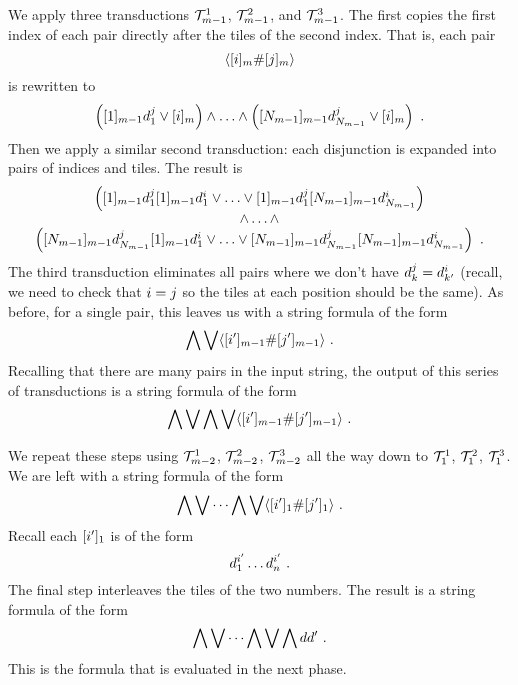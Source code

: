 We apply three transductions $\psst^1_{\expheight-1}$,
$\psst^2_{\expheight-1}$, and $\psst^3_{\expheight-1}$. The first copies
the first index of each pair directly after the tiles of the second
index. That is, each pair
\[
    \lmark \tenc{\expheight}{\idxi} \spacer \tenc{\expheight}{\idxj} \rmark
\]
is rewritten to
\[
    \brac{
        \tenc{\expheight-1}{1} \vartile^\idxj_1
        \lor
        \tenc{\expheight}{\idxi}
    }
    \land
    \ldots
    \land
    \brac{
        \tenc{\expheight-1}{\nmax{\expheight-1}}
            \vartile^\idxj_{\nmax{\expheight-1}}
        \lor
        \tenc{\expheight}{\idxi}
    } \ .
\]
Then we apply a similar second transduction: each disjunction is
expanded into pairs of indices and tiles. The result is
\[
    \begin{array}{c}
        \brac{
            \tenc{\expheight-1}{1} \vartile^\idxj_1
            \tenc{\expheight-1}{1} \vartile^\idxi_1
            \lor
            \ldots
            \lor
            \tenc{\expheight-1}{1} \vartile^\idxj_1
            \tenc{\expheight-1}{\nmax{\expheight-1}}
                \vartile^\idxi_{\nmax{\expheight-1}}
        } \\
        \land
        \ldots
        \land \\
        \brac{
            \tenc{\expheight-1}{\nmax{\expheight-1}}
                \vartile^\idxj_{\nmax{\expheight-1}}
            \tenc{\expheight-1}{1} \vartile^\idxi_1
            \lor
            \ldots
            \lor
            \tenc{\expheight-1}{\nmax{\expheight-1}}
                \vartile^\idxj_{\nmax{\expheight-1}}
            \tenc{\expheight-1}{\nmax{\expheight-1}}
                \vartile^\idxi_{\nmax{\expheight-1}}
        } \ .
    \end{array}
\]
The third transduction eliminates all pairs where we don't have
$\vartile^\idxj_\idxk = \vartile^\idxi_{\idxk'}$ (recall, we need to
check that $\idxi = \idxj$ so the tiles at each position should be the
same). As before, for a single pair, this leaves us with a string formula of
the form
\[
    \bigwedge \bigvee \lmark
        \tenc{\expheight-1}{\idxi'} \spacer \tenc{\expheight-1}{\idxj'}
    \rmark \ .
\]
Recalling that there are many pairs in the input string, the output of
this series of transductions is a string formula of the form
\[
    \bigwedge \bigvee \bigwedge \bigvee \lmark
        \tenc{\expheight-1}{\idxi'} \spacer \tenc{\expheight-1}{\idxj'}
    \rmark \ .
\]

We repeat these steps using $\psst^1_{\expheight-2}$,
$\psst^2_{\expheight-2}$, $\psst^3_{\expheight-2}$ all the way down to
$\psst^1_1$, $\psst^2_1$, $\psst^3_1$. We are left with a string formula of the
form
\[
    \bigwedge \bigvee \cdots \bigwedge \bigvee \lmark
        \tenc{1}{\idxi'} \spacer \tenc{1}{\idxj'}
    \rmark \ .
\]
Recall each $\tenc{1}{\idxi'}$ is of the form
\[
    \vartile^{\idxi'}_1 \ldots \vartile^{\idxi'}_\linlen \ .
\]
The final step interleaves the tiles of the two numbers. The result is a string
formula of the form
\[
    \bigwedge \bigvee \cdots \bigwedge \bigvee \bigwedge \vartile \vartile' \ .
\]
This is the formula that is evaluated in the next phase.

